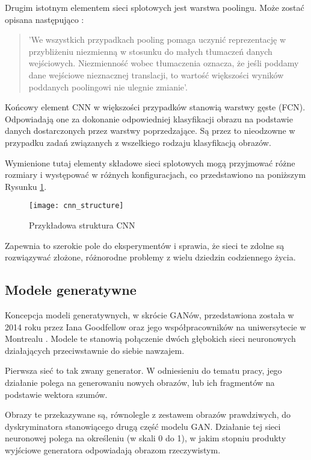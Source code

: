     Drugim istotnym elementem sieci splotowych jest warstwa poolingu. Może zostać opisana następująco \cite{pooling}:
    \begin{quote}
      'We wszystkich przypadkach pooling pomaga uczynić reprezentację w przybliżeniu niezmienną w stosunku do małych tłumaczeń danych wejściowych. Niezmienność wobec tłumaczenia oznacza, że jeśli poddamy dane wejściowe nieznacznej translacji, to wartość większości wyników poddanych poolingowi nie ulegnie zmianie'.
    \end{quote}

    Końcowy element CNN w większości przypadków stanowią warstwy gęste (FCN). Odpowiadają one za dokonanie odpowiedniej klasyfikacji obrazu na podstawie danych dostarczonych przez warstwy poprzedzające. Są przez to nieodzowne w przypadku zadań związanych z wszelkiego rodzaju klasyfikacją obrazów.

    Wymienione tutaj elementy składowe sieci splotowych mogą przyjmować różne rozmiary i występować w różnych konfiguracjach, co przedstawiono na poniższym Rysunku \ref{fig:cnn_structure}.
    \begin{figure}[h]
     \centering
     \texttt{[image: cnn\_structure]}
     \caption{Przykładowa struktura CNN}
     \label{fig:cnn_structure}
    \end{figure}
    \newline
    Zapewnia to szerokie pole do eksperymentów i sprawia, że sieci te zdolne są rozwiązywać złożone, różnorodne problemy z wielu dziedzin codziennego życia.

  \subsection{Modele generatywne}
  Koncepcja modeli generatywnych, w skrócie GANów, przedstawiona została w 2014 roku przez Iana Goodfellow oraz jego współpracowników na uniwersytecie w Montrealu \cite{gan}. Modele te stanowią połączenie dwóch głębokich sieci neuronowych działających przeciwstawnie do siebie nawzajem.

  Pierwsza sieć to tak zwany generator. W odniesieniu do tematu pracy, jego działanie polega na generowaniu nowych obrazów, lub ich fragmentów na podstawie wektora szumów.

  Obrazy te przekazywane są, równolegle z zestawem obrazów prawdziwych, do dyskryminatora stanowiącego drugą część modelu GAN. Działanie tej sieci neuronowej polega na określeniu (w skali 0 do 1), w jakim stopniu produkty wyjściowe generatora odpowiadają obrazom rzeczywistym.

